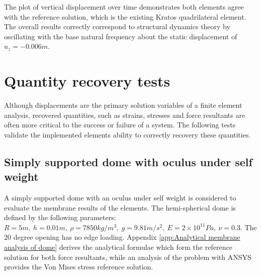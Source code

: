 The plot of vertical displacement over time demonstrates both elements agree with the reference solution, which is the existing Kratos quadrilateral element. The overall results correctly correspond to structural dynamics theory by oscillating with the base natural frequency about the static displacement of $u_z=-0.006m$.

\section{Quantity recovery tests}

Although displacements are the primary solution variables of a finite element analysis, recovered quantities, such as strains, stresses and force resultants are often more critical to the success or failure of a system. The following tests validate the implemented elements ability to correctly recovery these quantities.

\subsection{Simply supported dome with oculus under self weight}
\label{subsection:dome_test}

A simply supported dome with an oculus under self weight is considered to evaluate the membrane results of the elements. The hemi-spherical dome is defined by the following parameters: $R = 5m,\ h = 0.01m,\ \rho = 7850 kg/m^3,\ g = 9.81m/s^2,\ E = 2 \times 10^{11} Pa,\ \nu = 0.3$. The 20 degree opening has no edge loading. Appendix \ref{app:Analytical membrane analysis of dome} derives the analytical formulae which form the reference solution for both force resultants, while an analysis of the problem with ANSYS provides the Von Mises stress reference solution.

